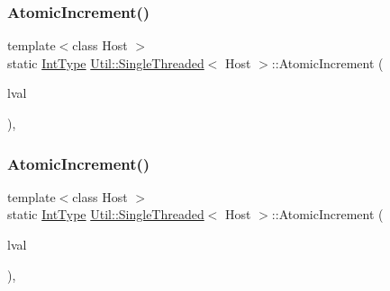 \mbox{\label{classUtil_1_1SingleThreaded_a72d41f77da5c6174b1ffb08cb21f1c39}} 
\subsubsection{\texorpdfstring{AtomicIncrement()}{AtomicIncrement()}\hspace{0.1cm}{\footnotesize\ttfamily [1/2]}}
{\footnotesize\ttfamily template$<$class Host $>$ \\
static \mbox{\hyperlink{classUtil_1_1SingleThreaded_a35932213fb0c15a7b67ced79bc2af4c6}{Int\+Type}} \mbox{\hyperlink{classUtil_1_1SingleThreaded}{Util\+::\+Single\+Threaded}}$<$ Host $>$\+::Atomic\+Increment (\begin{DoxyParamCaption}\item[{volatile \mbox{\hyperlink{classUtil_1_1SingleThreaded_a35932213fb0c15a7b67ced79bc2af4c6}{Int\+Type}} \&}]{lval }\end{DoxyParamCaption})\hspace{0.3cm}{\ttfamily [inline]}, {\ttfamily [static]}}

\mbox{\label{classUtil_1_1SingleThreaded_a72d41f77da5c6174b1ffb08cb21f1c39}} 
\subsubsection{\texorpdfstring{AtomicIncrement()}{AtomicIncrement()}\hspace{0.1cm}{\footnotesize\ttfamily [2/2]}}
{\footnotesize\ttfamily template$<$class Host $>$ \\
static \mbox{\hyperlink{classUtil_1_1SingleThreaded_a35932213fb0c15a7b67ced79bc2af4c6}{Int\+Type}} \mbox{\hyperlink{classUtil_1_1SingleThreaded}{Util\+::\+Single\+Threaded}}$<$ Host $>$\+::Atomic\+Increment (\begin{DoxyParamCaption}\item[{volatile \mbox{\hyperlink{classUtil_1_1SingleThreaded_a35932213fb0c15a7b67ced79bc2af4c6}{Int\+Type}} \&}]{lval }\end{DoxyParamCaption})\hspace{0.3cm}{\ttfamily [inline]}, {\ttfamily [static]}}

